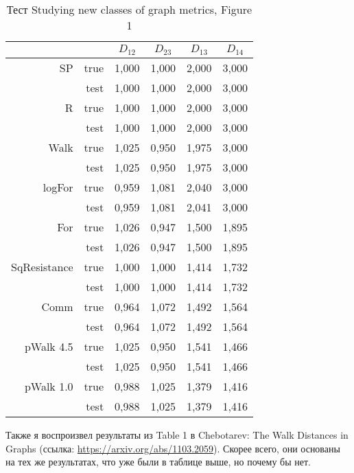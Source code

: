 \documentclass{article}
\begin{document}
\begin{table}[H]
\centering
\caption{Тест Studying new classes of graph metrics, Figure 1}
\label{}
\begin{tabular}{rr|cccc}
             &      & $D_{12}$ & $D_{23}$ & $D_{13}$ & $D_{14}$ \\
             \hline
SP           & true & 1,000 & 1,000 & 2,000 & 3,000 \\
             & test & 1,000 & 1,000 & 2,000 & 3,000 \\
             \hline
R            & true & 1,000 & 1,000 & 2,000 & 3,000 \\
             & test & 1,000 & 1,000 & 2,000 & 3,000 \\
             \hline
Walk         & true & 1,025 & 0,950 & 1,975 & 3,000 \\
             & test & 1,025 & 0,950 & 1,975 & 3,000 \\
             \hline
logFor       & true & 0,959 & 1,081 & 2,040 & 3,000 \\
             & test & 0,959 & 1,081 & 2,041 & 3,000 \\
             \hline
For          & true & 1,026 & 0,947 & 1,500 & 1,895 \\
             & test & 1,026 & 0,947 & 1,500 & 1,895 \\
             \hline
SqResistance & true & 1,000 & 1,000 & 1,414 & 1,732 \\
             & test & 1,000 & 1,000 & 1,414 & 1,732 \\
             \hline
Comm         & true & 0,964 & 1,072 & 1,492 & 1,564 \\
             & test & 0,964 & 1,072 & 1,492 & 1,564 \\
             \hline
pWalk 4.5    & true & 1,025 & 0,950 & 1,541 & 1,466 \\
             & test & 1,025 & 0,950 & 1,541 & 1,466 \\
             \hline
pWalk 1.0    & true & 0,988 & 1,025 & 1,379 & 1,416 \\
             & test & 0,988 & 1,025 & 1,379 & 1,416
\end{tabular}
\end{table}

Также я воспроизвел результаты из Table 1 в Chebotarev: The Walk Distances in Graphs (ссылка: \url{https://arxiv.org/abs/1103.2059}). Скорее всего, они основаны на тех же результатах, что уже были в таблице выше, но почему бы нет.
\end{document}
